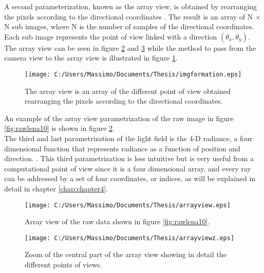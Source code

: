 A second parameterization, known as the array view, is obtained by rearranging the pixels according to the directional coordinates \cite{ng2006digital}. The result is an array of N $\times$ N sub images, where N is the number of samples of the directional coordinates. Each sub image represents the point of view linked with a direction $(\theta_x, \theta_y)$. The array view can be seen in figure \ref{fig:arrayview1} and \ref{fig:arrayview1z} while the method to pass from the camera view to the array view is illustrated in figure \ref{fig:arrayview}. \\
\begin{figure}[H]
	\centering
	\texttt{[image: C:/Users/Massimo/Documents/Thesis/imgformation.eps]}
	\caption{\label{fig:arrayview}The array view is an array of the different point of view obtained rearranging the pixels according to the directional coordinates.  }
\end{figure}
An example of the array view parametrization of the raw image in figure \ref{fig:rawlena10} is shown in figure \ref{fig:arrayview1}.\\
The third and last parametrization of the light field is the 4-D radiance, a four dimensional function that represents radiance as a function of position and direction. \cite{levoy1996light}. This third parametrization is less intuitive but is very useful from a computational point of view since it is a four dimensional array, and every ray can be addressed by a set of four coordinates, or indices, as will be explained in detail in chapter \ref{chap:chapter4}.
\newpage
\begin{figure}[H]
	\centering
	\texttt{[image: C:/Users/Massimo/Documents/Thesis/arrayview.eps]}
	\caption{\label{fig:arrayview1}Array view of the raw data shown in figure \ref{fig:rawlena10}.  }
\end{figure}
\begin{figure}[H]
	\centering
	\texttt{[image: C:/Users/Massimo/Documents/Thesis/arrayviewz.eps]}
	\caption{\label{fig:arrayview1z}Zoom of the central part of the array view showing in detail the different points of views.  }
\end{figure}
\newpage
